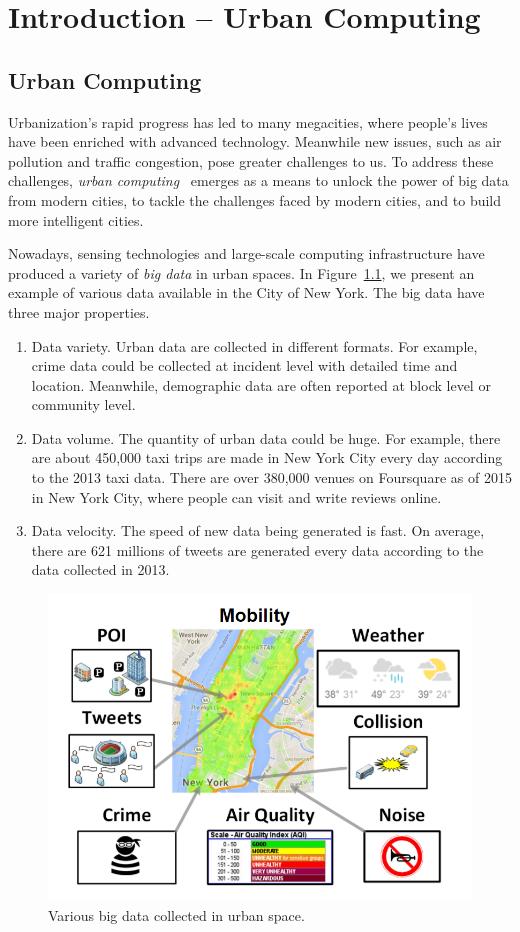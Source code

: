 \chapter{Introduction -- Urban Computing} 
\label{chapter1:introduction}



\section{Urban Computing}

Urbanization's rapid progress has led to many megacities, where people's lives have been enriched with advanced technology. Meanwhile new issues, such as air pollution and traffic congestion, pose greater challenges to us. To address these challenges, \emph{urban computing}~\cite{zheng2014urban} emerges as a means to unlock the power of big data from modern cities, to tackle the challenges faced by modern cities,  and to build more intelligent cities.

Nowadays, sensing technologies and large-scale computing infrastructure have produced a variety of \emph{big data} in urban spaces. In Figure~\ref{fig:intro}, we present an example of various data available in the City of New York. The big data have three major properties. 
\begin{enumerate}
\item Data variety. Urban data are collected in different formats. For example, crime data could be collected at incident level with detailed time and location. Meanwhile, demographic data are often reported at block level or community level.
\item Data volume. The quantity of urban data could be huge. For example, there are about 450,000 taxi trips are made in New York City every day according to the 2013 taxi data. There are over 380,000 venues on Foursquare as of 2015 in New York City, where people can visit and write reviews online.
\item Data velocity. The speed of new data being generated is fast. On average, there are 621 millions of tweets are generated every data according to the data collected in 2013.
\end{enumerate}

\begin{figure}[h]
\centering
\includegraphics[width=0.8\linewidth]{fig/intro-data-v2.png}
\caption{Various big data collected in urban space.}
\label{fig:intro}
\end{figure}

